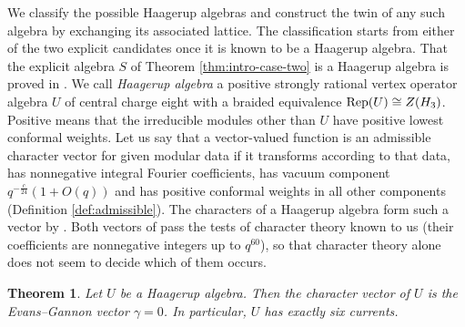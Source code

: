 \documentclass[leqno]{article}
\let\cal\relax
\newcommand{\cal}{\mathcal}
\DeclareMathOperator{\Rep}{Rep}
\newtheorem{thm}{Theorem}[section]
\numberwithin{equation}{section}
\begin{document}
We classify the possible Haagerup algebras and construct the twin of any such algebra by exchanging its associated lattice. The classification starts from either of the two explicit candidates once it is known to be a Haagerup algebra. That the explicit algebra $S$ of Theorem \ref{thm:intro-case-two} is a Haagerup algebra is proved in \cite[Theorem 6.1]{ArhIII}. We call \emph{Haagerup algebra} a positive strongly rational vertex operator algebra $U$ of central charge eight with a braided equivalence $\Rep(U) \cong Z(\cal H_3)$. Positive means that the irreducible modules other than $U$ have positive lowest conformal weights. Let us say that a vector-valued function is an admissible character vector for given modular data if it transforms according to that data, has nonnegative integral Fourier coefficients, has vacuum component $q^{-\frac{c}{24}}(1+O(q))$ and has positive conformal weights in all other components (Definition \ref{def:admissible}). The characters of a Haagerup algebra form such a vector by \cite{Zhu96,Hua08}. Both vectors of \cite{EvG11} pass the tests of character theory known to us (their coefficients are nonnegative integers up to $q^{60}$), so that character theory alone does not seem to decide which of them occurs.

\begin{thm}
\label{thm:intro-gamma}
Let $U$ be a Haagerup algebra. Then the character vector of $U$ is the Evans--Gannon vector $\gamma = 0$. In particular, $U$ has exactly six currents.
\end{thm}
\end{document}
